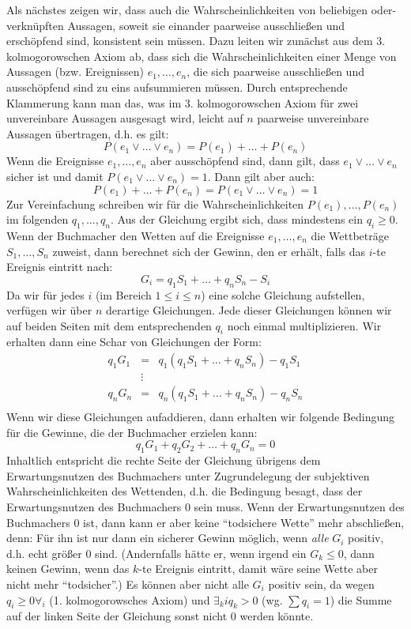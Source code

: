 Als nächstes zeigen wir, dass auch die Wahrscheinlichkeiten von beliebigen
oder-verknüpften Aussagen, soweit sie einander paarweise ausschließen und
erschöpfend sind, konsistent sein müssen. Dazu leiten wir zunächst aus dem 3.
kolmogorowschen Axiom ab, dass sich die Wahrscheinlichkeiten einer Menge von
Aussagen (bzw. Ereignissen) $e_1,\ldots,e_n$, die sich paarweise ausschließen
und ausschöpfend sind zu eins aufsummieren müssen. Durch entsprechende
Klammerung kann man das, was im 3. kolmogorowschen Axiom für zwei unvereinbare
Aussagen ausgesagt wird, leicht auf $n$ paarweise unvereinbare Aussagen
übertragen, d.h. es gilt:
\[ P(e_1\vee \ldots \vee e_n) = P(e_1) + \ldots + P(e_n) \]
Wenn die Ereignisse $e_1,\ldots,e_n$ aber ausschöpfend sind, dann gilt, dass
$e_1\vee \ldots \vee e_n$ sicher ist und damit $P(e_1\vee \ldots \vee e_n) =
1$. Dann gilt aber auch:
\[ P(e_1) + \ldots + P(e_n) = P(e_1\vee \ldots \vee e_n) = 1 \] 
Zur Vereinfachung schreiben wir für die Wahrscheinlichkeiten
$P(e_1),\ldots,P(e_n)$ im folgenden $q_1,\ldots,q_n$. Aus der Gleichung ergibt
sich, dass mindestens ein $q_i \geq 0$. Wenn der Buchmacher den Wetten auf die
Ereignisse $e_1,\ldots,e_n$ die Wettbeträge $S_1,\ldots,S_n$ zuweist, 
dann berechnet sich der Gewinn, den er
erhält, falls das $i$-te Ereignis eintritt nach:
\[G_i = q_1S_1 + \ldots + q_nS_n - S_i \]
Da wir für jedes $i$ (im Bereich $1 \leq i \leq n$) eine solche Gleichung
aufstellen, verfügen wir über $n$ derartige Gleichungen. Jede
dieser Gleichungen können wir auf beiden Seiten mit dem entsprechenden $q_i$
noch einmal multiplizieren. Wir erhalten dann eine Schar von Gleichungen der
Form:
\begin{eqnarray*}
q_1G_1 & = & q_1(q_1S_1 + \ldots + q_nS_n) - q_1S_1 \\
{ }    & \vdots & { } \\
q_nG_n & = & q_n(q_1S_1 + \ldots + q_nS_n) - q_nS_n \\ 
\end{eqnarray*}
Wenn wir diese Gleichungen aufaddieren, dann erhalten wir folgende
Bedingung für die Gewinne, die der Buchmacher erzielen kann:
\[ q_1G_1 + q_2G_2 + \ldots + q_nG_n = 0 \]
Inhaltlich entspricht die rechte Seite der Gleichung übrigens dem
Erwartungsnutzen des Buchmachers unter Zugrundelegung der subjektiven
Wahrscheinlichkeiten des Wettenden, d.h. die Bedingung besagt, dass der
Erwartungsnutzen des Buchmachers 0 sein muss. 
Wenn der Erwartungsnutzen\label{bmErwartungsnutzen} des Buchmachers 0 ist, dann
kann er aber keine "`todsichere Wette"' mehr abschließen, denn: Für ihn ist
nur dann ein sicherer Gewinn möglich, wenn {\em alle} $G_i$ positiv, d.h. echt größer 0
sind. (Andernfalls hätte er, wenn irgend ein $G_k \leq 0$, dann keinen Gewinn, 
wenn das $k$-te Ereignis eintritt,
damit wäre seine Wette aber nicht mehr "`todsicher"'.) 
Es können aber nicht alle $G_i$ positiv sein, da wegen $q_i \geq
0 \forall_i$ (1. kolmogorowsches Axiom) und $\exists_ki q_k > 0$ (wg. $\sum
q_i = 1$) die Summe auf der linken Seite der Gleichung sonst nicht 0 werden
könnte.

